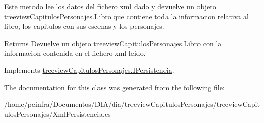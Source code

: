 Este metodo lee los datos del fichero xml dado y devuelve un objeto \hyperlink{classtreeview_capitulos_personajes_1_1_libro}{treeview\-Capitulos\-Personajes.\-Libro} que contiene toda la informacion relativa al libro, los capitulos con sus escenas y los personajes. 

\begin{DoxyReturn}{Returns}
Devuelve un objeto \hyperlink{classtreeview_capitulos_personajes_1_1_libro}{treeview\-Capitulos\-Personajes.\-Libro} con la informacion contenida en el fichero xml leido. 
\end{DoxyReturn}


Implements \hyperlink{interfacetreeview_capitulos_personajes_1_1_i_persistencia_ac29bf48a9d012f61d9465978a61a2c82}{treeview\-Capitulos\-Personajes.\-I\-Persistencia}.



The documentation for this class was generated from the following file\-:\begin{DoxyCompactItemize}
\item 
/home/pcinfra/\-Documentos/\-D\-I\-A/dia/treeview\-Capitulos\-Personajes/treeview\-Capitulos\-Personajes/Xml\-Persistencia.\-cs\end{DoxyCompactItemize}
